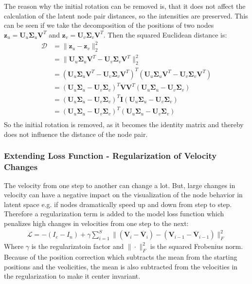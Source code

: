 \\\\
The reason why the initial rotation can be removed is, that it does not affect the calculation of the latent node pair distances, so the intensities are preserved. This can be seen if we take the decomposition of the positions of two nodes $\textbf{z}_u = \textbf{U}_u \boldsymbol{\Sigma}_u \textbf{V}^T$ and $\textbf{z}_v= \textbf{U}_v \boldsymbol{\Sigma}_v \textbf{V}^T$. Then the squared Euclidean distance is:
\begin{align}
      \mathcal{D} &= \rVert \textbf{z}_u - \textbf{z}_v \rVert_2^2 \\
      &= \rVert \textbf{U}_u \boldsymbol{\Sigma}_u \textbf{V}^T - \textbf{U}_v \boldsymbol{\Sigma}_v \textbf{V}^T \rVert_2^2 \\
      &= (\textbf{U}_u \boldsymbol{\Sigma}_u \textbf{V}^T - \textbf{U}_v \boldsymbol{\Sigma}_v \textbf{V}^T)^T (\textbf{U}_u \boldsymbol{\Sigma}_u \textbf{V}^T - \textbf{U}_v \boldsymbol{\Sigma}_v \textbf{V}^T)\\
      &= (\textbf{U}_u \boldsymbol{\Sigma}_u - \textbf{U}_v \boldsymbol{\Sigma}_v)^T\textbf{V} \textbf{V}^T(\textbf{U}_u \boldsymbol{\Sigma}_u - \textbf{U}_v \boldsymbol{\Sigma}_v)\\
      &= (\textbf{U}_u \boldsymbol{\Sigma}_u - \textbf{U}_v \boldsymbol{\Sigma}_v)^T \textbf{I} (\textbf{U}_u \boldsymbol{\Sigma}_u - \textbf{U}_v \boldsymbol{\Sigma}_v)\\
      &= (\textbf{U}_u \boldsymbol{\Sigma}_u - \textbf{U}_v \boldsymbol{\Sigma}_v)^T (\textbf{U}_u \boldsymbol{\Sigma}_u - \textbf{U}_v \boldsymbol{\Sigma}_v)\\
\end{align}
So the initial rotation is removed, as it becomes the identity matrix and thereby does not influence the distance of the node pair.


\subsubsection{Extending Loss Function - Regularization of Velocity Changes}
\label{sec:Method:ProposedModel:Regularization}
The velocity from one step to another can change a lot. But, large changes in velocity can have a negative impact on the visualization of the node behavior in latent space e.g. if nodes dramatically speed up and down from step to step.
Therefore a regularization term is added to the model loss function which penalizes high changes in velocities from one step to the next:
\begin{align}
    \mathcal{L} = - (I_e - I_n) + \gamma \sum_{i=1}^{S} \rVert (\textbf{V}_i - \overline{\textbf{V}}_i) - (\textbf{V}_{i-1} - \overline{\textbf{V}}_{i-1}) \rVert_{F}^{2}
    \label{eq:Method:ProposedModel:vec_regularization}
\end{align}
Where $\gamma$ is the regularizatoin factor and $\rVert \cdot \rVert_F^2$ is the squared Frobenius norm. Because of the position correction which subtracts the mean from the starting positions and the veolicities, the mean is also subtracted from the velocities in the regularization to make it center invariant.



